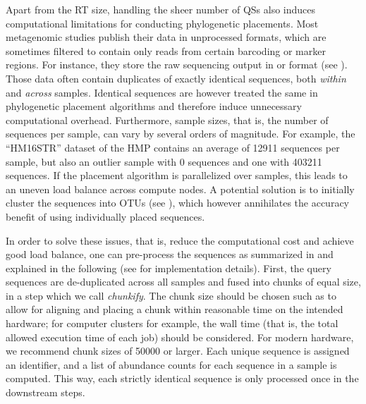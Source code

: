 Apart from the \ac{RT} size, handling the sheer number of \acp{QS}
also induces computational limitations for conducting phylogenetic placements.
Most metagenomic studies publish their data in unprocessed formats,
which are sometimes filtered to contain only reads from certain barcoding or marker regions.
For instance, they store the raw sequencing output in  \citep{Pearson1988}
or  \citep{Cock2009} format (see ).
Those data often contain duplicates of exactly identical sequences, both {\em within} and {\em across} samples.
Identical sequences are however treated the same in phylogenetic placement algorithms
and therefore induce unnecessary computational overhead.
Furthermore, sample sizes, that is, the number of sequences per sample, can vary by several orders of magnitude.
For example, the ``HM16STR'' dataset of the \acf{HMP} \citep{Huttenhower2012,Methe2012}
contains an average of \num{12 911} sequences per sample,
but also an outlier sample with \num{0} sequences and one with \num{403 211} sequences.
If the placement algorithm is parallelized over samples, this leads to an uneven load balance across compute nodes.
A potential solution is to initially cluster the sequences into OTUs
(see ),
which however annihilates the accuracy benefit of using individually placed sequences.

In order to solve these issues, that is, reduce the computational cost and achieve good load balance,
one can pre-process the sequences as summarized in  and explained in the following
(see  for implementation details).
First, the query sequences are de-duplicated across all samples and fused into chunks of equal size,
in a step which we call \emph{chunkify}.
The chunk size should be chosen such as to allow for aligning and placing a chunk
within reasonable time on the intended hardware;
for computer clusters for example, the wall time (that is, the total allowed execution time of each job) should be considered.
For modern hardware, we recommend chunk sizes of \num{50 000} or larger.
Each unique sequence is assigned an identifier,
and a list of abundance counts for each sequence in a sample is computed.
This way, each strictly identical sequence is only processed once in the downstream steps.

